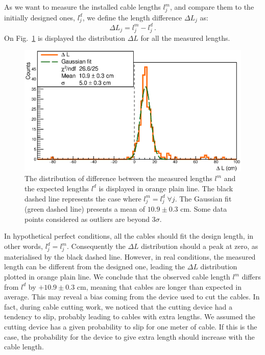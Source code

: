 As we want to measure the installed cable lengths $l^{m}_{j}$, and compare them to the initially designed ones, $l^{d}_{j}$, we define the length difference $\Delta L_{j}$ as:
\begin{equation}
  \Delta L_{j} = l^{m}_{j}-l^{d}_{j}\, .
\end{equation}
On Fig.~\ref{fig:LengthDiff} is displayed the distribution $\Delta L$ for all the measured lengths.
\begin{figure}
  \centering
  \includegraphics[width=15cm]{commissioning/fig_commissioning/length_diff.eps}

  \caption{The distribution of difference between the measured lengths $l^{m}$ and the expected lengths $l^{d}$ is displayed in orange plain line.
    The black dashed line represents the case where $l^{m}_{j} = l^{d}_{j} \;\forall j$.
    The Gaussian fit (green dashed line) presents a mean of $10.9 \pm 0.3$ cm.
    Some data points considered as outliers are beyond $3\sigma$.
    \label{fig:LengthDiff}}
\end{figure}
In hypothetical perfect conditions, all the cables should fit the design length, in other words, $l^{d}_{j} = l^{m}_{j}$.
Consequently the $\Delta L$ distribution should a peak at zero, as materialised by the black dashed line.
However, in real conditions, the measured length can be different from the designed one, leading the $\Delta L$ distribution plotted in orange plain line.
We conclude that the observed cable length $l^{m}$ differs from $l^{d}$ by $+10.9\pm 0.3$ cm, meaning that cables are longer than expected in average.
This may reveal a bias coming from the device used to cut the cables.
In fact, during cable cutting work, we noticed that the cutting device had a tendency to slip, probably leading to cables with extra lengths.
We assumed the cutting device has a given probability to slip for one meter of cable.
If this is the case, the probability for the device to give extra length should increase with the cable length.

